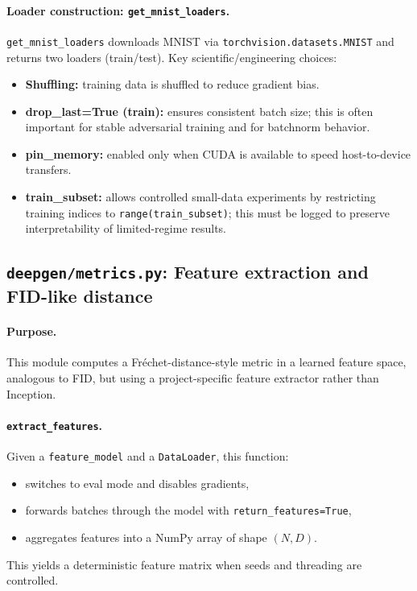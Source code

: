 \paragraph{Loader construction: \texttt{get\_mnist\_loaders}.}
\texttt{get\_mnist\_loaders} downloads MNIST via \texttt{torchvision.datasets.MNIST} and returns two loaders (train/test). Key scientific/engineering choices:
\begin{itemize}
  \item \textbf{Shuffling:} training data is shuffled to reduce gradient bias.
  \item \textbf{drop\_last=True (train):} ensures consistent batch size; this is often important for stable adversarial training and for batchnorm behavior.
  \item \textbf{pin\_memory:} enabled only when CUDA is available to speed host-to-device transfers.
  \item \textbf{train\_subset:} allows controlled small-data experiments by restricting training indices to \texttt{range(train\_subset)}; this must be logged to preserve interpretability of limited-regime results.
\end{itemize}

\subsection{\texttt{deepgen/metrics.py}: Feature extraction and FID-like distance}
\paragraph{Purpose.}
This module computes a Fréchet-distance-style metric in a learned feature space, analogous to FID, but using a project-specific feature extractor rather than Inception.

\paragraph{\texttt{extract\_features}.}
Given a \texttt{feature\_model} and a \texttt{DataLoader}, this function:
\begin{itemize}
  \item switches to eval mode and disables gradients,
  \item forwards batches through the model with \texttt{return\_features=True},
  \item aggregates features into a NumPy array of shape $(N,D)$.
\end{itemize}
This yields a deterministic feature matrix when seeds and threading are controlled.

